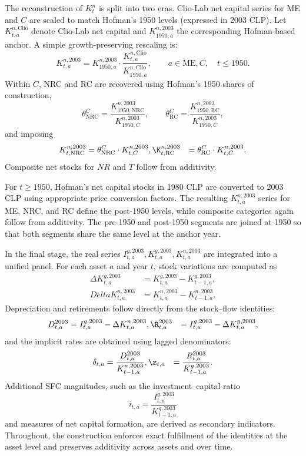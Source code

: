 \documentclass[11pt,a4paper]{article}
\begin{document}
The reconstruction of $K_t^{n}$ is split into two eras. Clio-Lab net capital series for ME and $C$ are scaled to match Hofman's 1950 levels (expressed in 2003 CLP). Let $K_{t,a}^{n,\text{Clio}}$ denote Clio-Lab net capital and $K_{1950,a}^{n,2003}$ the corresponding Hofman-based anchor. A simple growth-preserving rescaling is:\begin{equation}K_{t,a}^{n,2003} = K_{1950,a}^{n,2003} \cdot \frac{K_{t,a}^{n,\text{Clio}}}{K_{1950,a}^{n,\text{Clio}}},\qquad a \in {\text{ME},C}, \quad t \leq 1950.\end{equation}Within $C$, NRC and RC are recovered using Hofman's 1950 shares of construction,\begin{equation}\theta_{\text{NRC}}^{C} = \frac{K_{1950,\text{NRC}}^{n,2003}}{K_{1950,C}^{n,2003}},\qquad\theta_{\text{RC}}^{C} = \frac{K_{1950,\text{RC}}^{n,2003}}{K_{1950,C}^{n,2003}},\end{equation}and imposing\begin{align}K_{t,\text{NRC}}^{n,2003} &= \theta_{\text{NRC}}^{C} \cdot K_{t,C}^{n,2003}, \K_{t,\text{RC}}^{n,2003} &= \theta_{\text{RC}}^{C} \cdot K_{t,C}^{n,2003}.\end{align}Composite net stocks for $NR$ and $T$ follow from additivity.

For $t \geq 1950$, Hofman's net capital stocks in 1980 CLP are converted to 2003 CLP using appropriate price conversion factors. The resulting $K_{t,a}^{n,2003}$ series for ME, NRC, and RC define the post-1950 levels, while composite categories again follow from additivity. The pre-1950 and post-1950 segments are joined at 1950 so that both segments share the same level at the anchor year.

In the final stage, the real series ${I_{t,a}^{g,2003},K_{t,a}^{g,2003},K_{t,a}^{n,2003}}$ are integrated into a unified panel. For each asset $a$ and year $t$, stock variations are computed as\begin{align}\Delta K_{t,a}^{g,2003} &= K_{t,a}^{g,2003} - K_{t-1,a}^{g,2003}, \\Delta K_{t,a}^{n,2003} &= K_{t,a}^{n,2003} - K_{t-1,a}^{n,2003}.\end{align}Depreciation and retirements follow directly from the stock--flow identities:\begin{align}D_{t,a}^{2003} &= I_{t,a}^{g,2003} - \Delta K_{t,a}^{n,2003}, \R_{t,a}^{2003} &= I_{t,a}^{g,2003} - \Delta K_{t,a}^{g,2003},\end{align}and the implicit rates are obtained using lagged denominators:\begin{align}\delta_{t,a} &= \frac{D_{t,a}^{2003}}{K_{t-1,a}^{n,2003}}, \z_{t,a} &= \frac{R_{t,a}^{2003}}{K_{t-1,a}^{g,2003}}.\end{align}Additional SFC magnitudes, such as the investment--capital ratio\begin{equation}i_{t,a} = \frac{I_{t,a}^{g,2003}}{K_{t-1,a}^{g,2003}}\end{equation}and measures of net capital formation, are derived as secondary indicators. Throughout, the construction enforces exact fulfillment of the identities at the asset level and preserves additivity across assets and over time.
\end{document}

